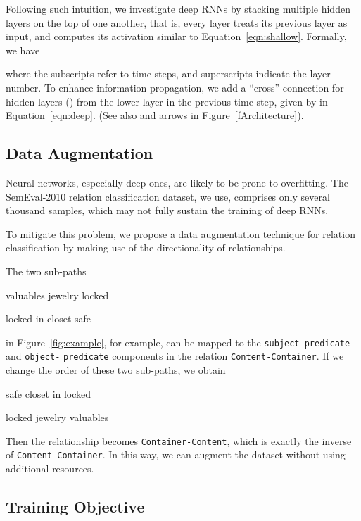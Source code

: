 \documentclass[11pt]{article}
\begin{document}
Following such intuition, we investigate deep RNNs by stacking multiple hidden layers on the top of one another, that is, every layer treats its previous layer as input, and computes its activation similar to Equation~\ref{eqn:shallow}.
Formally, we have


where the subscripts refer to time steps, and superscripts indicate the layer number.
To enhance information propagation, we add a ``cross'' connection for hidden layers () from the lower layer in the previous time step, given by  in Equation~\ref{eqn:deep}. (See also  and   arrows in Figure~\ref{fArchitecture}).





\bigskip
\subsection{Data Augmentation}\label{ssDataAug}
Neural networks, especially deep ones, are likely to be prone to overfitting. The SemEval-2010 relation classification dataset, we use, comprises only several thousand samples, which may not fully sustain the training of deep RNNs.

To mitigate this problem, we propose a data augmentation technique for relation classification by making use of the directionality of relationships.

The two sub-paths
\begin{compactitem}
\item[] valuables  jewelry   locked
\item[] locked  in  closet  safe
\end{compactitem}
in Figure~\ref{fig:example}, for example, can be mapped to the {\tt subject-predicate} and
{\tt object-} {\tt predicate} components in the relation {\tt Content-}{\tt Container}. If we change the order of these two sub-paths, we obtain
\begin{compactitem}
\item[] safe  closet  in  locked
\item[] locked  jewelry  valuables
\end{compactitem}
Then the relationship becomes {\tt Container-}{\tt Content}, which is exactly the inverse of {\tt Content-}{\tt Container}. In this way, we can augment the dataset without using additional resources.

\subsection{Training Objective}\label{ssObjective}
\end{document}
